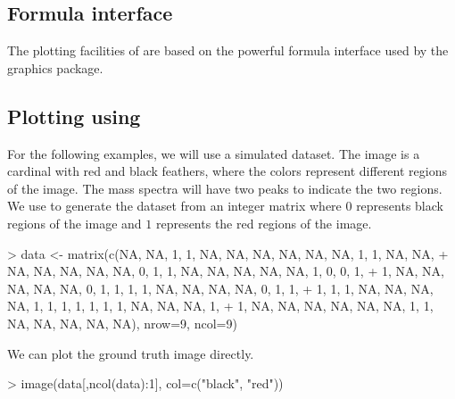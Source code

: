 \documentclass[a4paper]{article}
\begin{document}
\subsection{Formula interface}

The plotting facilities of  are based on the powerful formula interface used by the  graphics package.

\subsection{Plotting using }

For the following examples, we will use a simulated dataset. The image is a cardinal with red and black feathers, where the colors represent different regions of the image. The mass spectra will have two peaks to indicate the two regions. We use  to generate the dataset from an integer matrix where $0$ represents black regions of the image and $1$ represents the red regions of the image.
\begin{Schunk}
\begin{Sinput}
> data <- matrix(c(NA, NA, 1, 1, NA, NA, NA, NA, NA, NA, 1, 1, NA, NA, 
+  NA, NA, NA, NA, NA, 0, 1, 1, NA, NA, NA, NA, NA, 1, 0, 0, 1, 
+  1, NA, NA, NA, NA, NA, 0, 1, 1, 1, 1, NA, NA, NA, NA, 0, 1, 1, 
+  1, 1, 1, NA, NA, NA, NA, 1, 1, 1, 1, 1, 1, 1, NA, NA, NA, 1, 
+  1, NA, NA, NA, NA, NA, NA, 1, 1, NA, NA, NA, NA, NA), nrow=9, ncol=9)
\end{Sinput}
\end{Schunk}
We can plot the ground truth image directly.
\begin{Schunk}
\begin{Sinput}
> image(data[,ncol(data):1], col=c("black", "red"))
\end{Sinput}
\end{Schunk}
\end{document}
